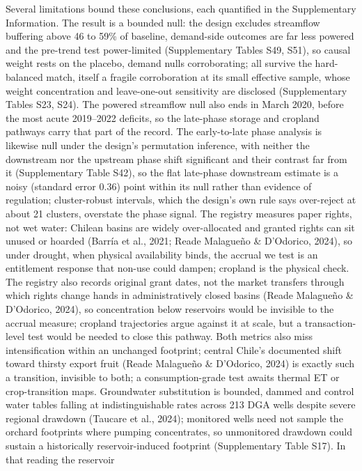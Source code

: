 \documentclass[
]{agujournal2019}
\begin{document}
Several limitations bound these conclusions, each quantified in the
Supplementary Information. The result is a bounded null: the design
excludes streamflow buffering above 46 to 59\% of baseline, demand-side
outcomes are far less powered and the pre-trend test power-limited
(Supplementary Tables S49, S51), so causal weight rests on the placebo,
demand nulls corroborating; all survive the hard-balanced match, itself
a fragile corroboration at its small effective sample, whose weight
concentration and leave-one-out sensitivity are disclosed (Supplementary
Tables S23, S24). The powered streamflow null also ends in March 2020,
before the most acute 2019--2022 deficits, so the late-phase storage and
cropland pathways carry that part of the record. The early-to-late phase
analysis is likewise null under the design's permutation inference, with
neither the downstream nor the upstream phase shift significant and
their contrast far from it (Supplementary Table S42), so the flat
late-phase downstream estimate is a noisy (standard error 0.36) point
within its null rather than evidence of regulation; cluster-robust
intervals, which the design's own rule says over-reject at about 21
clusters, overstate the phase signal. The registry measures paper
rights, not wet water: Chilean basins are widely over-allocated and
granted rights can sit unused or hoarded (Barría et al., 2021; Reade
Malagueño \& D'Odorico, 2024), so under drought, when physical
availability binds, the accrual we test is an entitlement response that
non-use could dampen; cropland is the physical check. The registry also
records original grant dates, not the market transfers through which
rights change hands in administratively closed basins (Reade Malagueño
\& D'Odorico, 2024), so concentration below reservoirs would be
invisible to the accrual measure; cropland trajectories argue against it
at scale, but a transaction-level test would be needed to close this
pathway. Both metrics also miss intensification within an unchanged
footprint; central Chile's documented shift toward thirsty export fruit
(Reade Malagueño \& D'Odorico, 2024) is exactly such a transition,
invisible to both; a consumption-grade test awaits thermal ET or
crop-transition maps. Groundwater substitution is bounded, dammed and
control water tables falling at indistinguishable rates across 213 DGA
wells despite severe regional drawdown (Taucare et al., 2024); monitored
wells need not sample the orchard footprints where pumping concentrates,
so unmonitored drawdown could sustain a historically reservoir-induced
footprint (Supplementary Table S17). In that reading the reservoir
\end{document}
